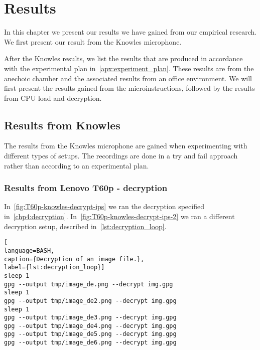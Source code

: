 \chapter{Results}
\label{chp:results} 
In this chapter we present our results we have gained from our empirical research. 
We first present our result from the Knowles microphone.

After the Knowles results, we list the results that are produced in accordance with the experimental plan in~\autoref{apx:experiment_plan}. 
These results are from the anechoic chamber and the associated results from an office environment.  
We will first present the results gained from the microinstructions, followed by the results from CPU load and decryption. 

\section{Results from Knowles}\label{sec:knowles_results}
The results from the Knowles microphone are gained when experimenting with different types of setups.
The recordings are done in a try and fail approach rather than according to an experimental plan.

\subsection{Results from Lenovo T60p - decryption}\label{subsec:t60p_knowles_results_decryption}
In~\autoref{fig:T60p-knowles-decrypt-ips} we ran the decryption specified in~\autoref{chp4:decryption}. 
In~\autoref{fig:T60p-knowles-decrypt-ips-2} we ran a different decryption setup, described in~\autoref{lst:decryption_loop}.

\begin{lstlisting}[
language=BASH, 
caption={Decryption of an image file.}, 
label={lst:decryption_loop}]
sleep 1             
gpg --output tmp/image_de.png --decrypt img.gpg
sleep 1
gpg --output tmp/image_de2.png --decrypt img.gpg
sleep 1
gpg --output tmp/image_de3.png --decrypt img.gpg
gpg --output tmp/image_de4.png --decrypt img.gpg    
gpg --output tmp/image_de5.png --decrypt img.gpg
gpg --output tmp/image_de6.png --decrypt img.gpg
\end{lstlisting}

